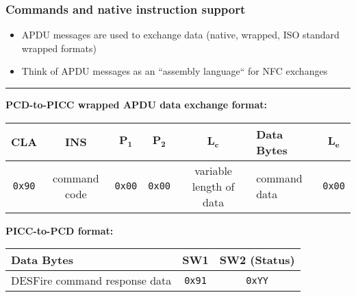 \documentclass[usenames,svgnames,dvipsnames,11pt]{beamer}
\begin{document}
\begin{frame}[fragile]
\frametitle{Commands and native instruction support}

\begin{itemize}
\item APDU messages are used to exchange data (native, wrapped, ISO standard wrapped formats)
\item Think of APDU messages as an ``assembly language`` for NFC exchanges 
\end{itemize}
\medskip 
\hrule
\medskip

     \scriptsize
     \textbf{\large{PCD-to-PICC wrapped APDU data exchange format:}}
     \begin{center}
     \begin{tabular}{|c|c|c|c|c|l|c|} 
     \hline
     \textbf{CLA} & \textbf{INS} & $\mathbf{P_1}$ & $\mathbf{P_2}$ & $\mathbf{L_c}$ & 
     \textbf{Data Bytes} & $\mathbf{L_e}$ \\ 
     \hline
     \texttt{0x90} & command code & \texttt{0x00} & \texttt{0x00} & variable length of data & 
     command data & \texttt{0x00} \\ 
     \hline
     \end{tabular}
     \end{center}
     \bigskip 
     \textbf{\large{PICC-to-PCD format:}}
     \begin{center}
     \begin{tabular}{|l|c|c|} 
     \hline 
     \textbf{Data Bytes} & \textbf{SW1} & \textbf{SW2 (Status)} \\ 
     \hline 
     DESFire command response data & 
     \texttt{0x91} & \texttt{0xYY} \\ 
     \hline 
     \end{tabular} 
     \end{center} 

\end{frame}
\end{document}
